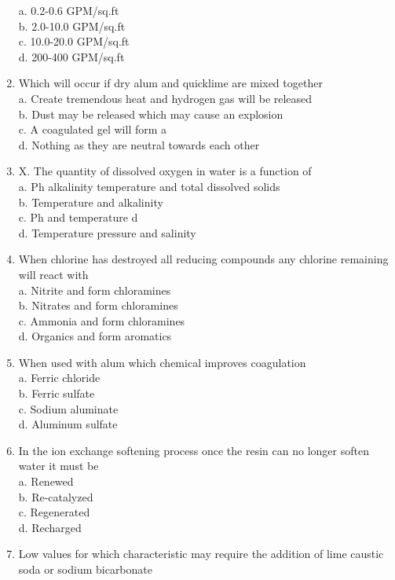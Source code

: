 \begin{enumerate}
a.	0.2-0.6 GPM/sq.ft\\
b.	2.0-10.0 GPM/sq.ft\\
c.	10.0-20.0 GPM/sq.ft\\
d.	200-400 GPM/sq.ft\\
\item Which will occur if dry alum and quicklime are mixed together\\
a.  Create tremendous heat and hydrogen gas will be released\\
b.  Dust may be released which may cause an explosion\\
c.  A coagulated gel will form  a\\
d.  Nothing as they are neutral towards each other\\
\item {X.  }The quantity of dissolved oxygen in water is a function of\\
a.  Ph alkalinity temperature and total dissolved solids\\
b.  Temperature and alkalinity\\
c.  Ph and temperature  d\\
d.  Temperature pressure and salinity\\
\item When chlorine has destroyed all reducing compounds any chlorine remaining will react with\\
a.  Nitrite and form chloramines\\
b.  Nitrates and form chloramines\\
c.  Ammonia and form chloramines\\
d.  Organics and form aromatics\\
\item When used with alum which chemical improves coagulation\\
a.  Ferric chloride\\
b.  Ferric sulfate\\
c.  Sodium aluminate\\
d.  Aluminum sulfate\\
\item In the ion exchange softening process once the resin can no longer soften water it must be\\
a.  Renewed\\
b.  Re-catalyzed\\
c.  Regenerated\\
d.  Recharged\\
\item Low values for which characteristic may require the addition of lime caustic soda or sodium bicarbonate\\

\end{enumerate}

